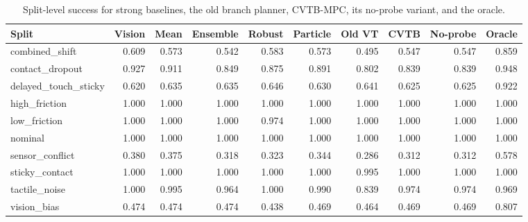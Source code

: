 \begin{table}[t]
\centering
\caption{Split-level success for strong baselines, the old branch planner, CVTB-MPC, its no-probe variant, and the oracle.}
\label{tab:selected-splits}
\scriptsize
\setlength{\tabcolsep}{3.5pt}
\begin{tabular}{lrrrrrrrrr}
\toprule
Split & Vision & Mean & Ensemble & Robust & Particle & Old VT & CVTB & No-probe & Oracle \\
\midrule
combined\_shift & 0.609 & 0.573 & 0.542 & 0.583 & 0.573 & 0.495 & 0.547 & 0.547 & 0.859 \\
contact\_dropout & 0.927 & 0.911 & 0.849 & 0.875 & 0.891 & 0.802 & 0.839 & 0.839 & 0.948 \\
delayed\_touch\_sticky & 0.620 & 0.635 & 0.635 & 0.646 & 0.630 & 0.641 & 0.625 & 0.625 & 0.922 \\
high\_friction & 1.000 & 1.000 & 1.000 & 1.000 & 1.000 & 1.000 & 1.000 & 1.000 & 1.000 \\
low\_friction & 1.000 & 1.000 & 1.000 & 0.974 & 1.000 & 1.000 & 1.000 & 1.000 & 1.000 \\
nominal & 1.000 & 1.000 & 1.000 & 1.000 & 1.000 & 1.000 & 1.000 & 1.000 & 1.000 \\
sensor\_conflict & 0.380 & 0.375 & 0.318 & 0.323 & 0.344 & 0.286 & 0.312 & 0.312 & 0.578 \\
sticky\_contact & 1.000 & 1.000 & 1.000 & 1.000 & 1.000 & 0.995 & 1.000 & 1.000 & 1.000 \\
tactile\_noise & 1.000 & 0.995 & 0.964 & 1.000 & 0.990 & 0.839 & 0.974 & 0.974 & 0.969 \\
vision\_bias & 0.474 & 0.474 & 0.474 & 0.438 & 0.469 & 0.464 & 0.469 & 0.469 & 0.807 \\
\bottomrule
\end{tabular}
\end{table}
